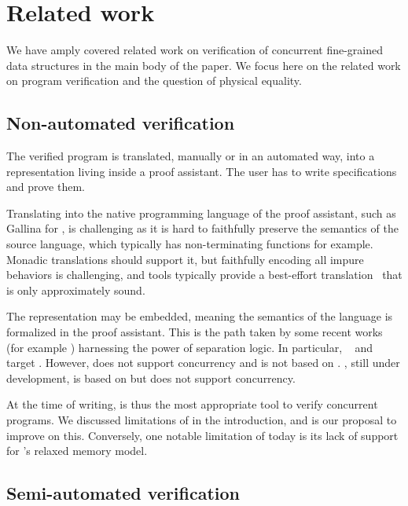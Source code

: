 \section{Related work}
\label{sec:related}

We have amply covered related work on verification of concurrent fine-grained data structures in the main body of the paper. We focus here on the related work on program verification and the question of physical equality.

\subsection{Non-automated verification}

The verified program is translated, manually or in an automated way, into a representation living inside a proof assistant.
The user has to write specifications and prove them.

Translating into the native programming language of the proof assistant, such as Gallina for \Rocq, is challenging as it is hard to faithfully preserve the semantics of the source language, which typically has non-terminating functions for example. Monadic translations should support it, but faithfully encoding all impure behaviors is challenging, and tools typically provide a best-effort translation~\citep*{coq-of-ocaml,DBLP:conf/cpp/Spector-Zabusky18} that is only approximately sound.

The representation may be embedded, meaning the semantics of the language is formalized in the proof assistant.
This is the path taken by some recent works (for example \citet*{DBLP:journals/pacmpl/GondelmanHPTB23}) harnessing the power of separation logic.
In particular, \CFML~\cite{DBLP:books/hal/Chargueraud23} and \Osiris~\cite{osiris} target \OCaml.
However, \CFML does not support concurrency and is not based on \Iris.
\Osiris, still under development, is based on \Iris but does not support concurrency.

At the time of writing, \HeapLang is thus the most appropriate tool to verify concurrent \OCaml programs. We discussed limitations of \HeapLang in the introduction, and \ZooLang is our proposal to improve on this. Conversely, one notable limitation of \ZooLang today is its lack of support for \OCaml's relaxed memory model.

\subsection{Semi-automated verification}


